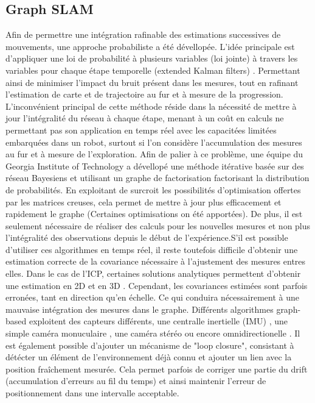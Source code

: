 \documentclass[twoside,twocolumn]{article}
\begin{document}
\subsection{Graph SLAM}
Afin de permettre une intégration rafinable des estimations successives de mouvements, une approche probabiliste a été dévellopée.
L'idée principale est d'appliquer une loi de probabilité à plusieurs variables (loi jointe) à travers les variables pour chaque étape
temporelle (extended Kalman filters) \cite{arulampalam_tutorial_2002}. Permettant ainsi de minimiser l'impact du bruit présent dans les mesures,
tout en rafinant l'estimation de carte et de trajectoire au fur et à mesure de la progression. L'inconvénient principal de cette méthode réside dans
la nécessité de mettre à jour l'intégralité du réseau à chaque étape, menant à un coût en calculs ne permettant pas son application en temps réel avec
les capacitées limitées embarquées dans un robot, surtout si l'on considère l'accumulation des mesures au fur et à mesure de l'exploration.
Afin de palier à ce problème, une équipe du Georgia Institute of Technology a dévellopé une méthode itérative\cite{kaess_isam:_2008} basée sur des réseau Bayesiens
et utilisant un graphe de factorisation factorisant la distribution de probabilités. En exploitant de surcroit les possibilités d'optimisation offertes
par les matrices creuses, cela permet de mettre à jour plus efficacement et rapidement le graphe (Certaines optimisations on été apportées\cite{kaess_isam2:_2012}). De plus, il est seulement nécessaire de réaliser
des calculs pour les nouvelles mesures et non plus l'intégralité des observations depuis le début de l'expérience.S'il est possible d'utiliser ces algorithmes en temps réel,
il reste toutefois difficile d'obtenir une estimation correcte de la covariance nécessaire à l'ajustement des mesures entres elles.
Dans le cas de l'ICP, certaines solutions analytiques permettent d'obtenir une estimation en 2D \cite{censi_accurate_2007} et en 3D \cite{prakhya_closed-form_2015}.
Cependant, les covariances estimées sont parfois erronées, tant en direction qu'en échelle. Ce qui conduira nécessairement à une mauvaise intégration des mesures dans
le graphe.
Différents algorithmes graph-based exploitent des capteurs différents, une centralle inertielle (IMU) \cite{robertson_simultaneous_2009}, une simple caméra monuculaire
\cite{mur-artal_orb-slam:_2015}\cite{engel_lsd-slam:_2014},
une caméra stéréo \cite{engel_large-scale_2015} ou encore omnidirectionelle \cite{caruso_large-scale_2015}. Il est également possible d'ajouter un mécanisme de
"loop closure", consistant à détécter un élément de l'environnement
déjà connu et ajouter un lien avec la position fraîchement mesurée. Cela permet parfois de corriger une partie du drift (accumulation d'erreurs au fil du temps)
et ainsi maintenir l'erreur de positionnement dans une intervalle acceptable.
\end{document}
